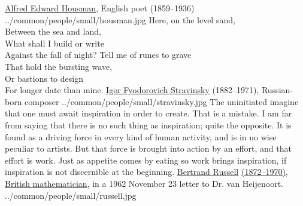 ﻿%
\cleartooddpage%
\thispagestyle{empty}%
\mbox{}\vfill
{}
\qboxnpqt
  {\href{http://en.wikipedia.org/wiki/Housman}{Alfred Edward Housman}, English poet (1859--1936)
    \footnotemark
  }{../common/people/small/housman.jpg}
  {Here, on the level sand, \\
    Between the sea and land, \\
    What shall I build or write \\
    Against the fall of night?
  }{Tell me of runes to grave \\
    That hold the bursting wave, \\
    Or bastions to design \\
    For longer date than mine.
  }
\vfill
\qboxnps
  {
    \href{http://en.wikipedia.org/wiki/Igor_Stravinsky}{Igor Fyodorovich Stravinsky}
    (1882--1971), Russian-born composer
    \footnotemark
  }{../common/people/small/stravinsky.jpg}
  {The uninitiated imagine that one must await inspiration in order to create.
   That is a mistake.
   I am far from saying that there is no such thing as inspiration;
   quite the opposite.
   It is found as a driving force in every kind of human activity, 
   and is in no wise peculiar to artists.
   But that force is brought into action by an effort, 
   and that effort is work.
   Just as appetite comes by eating so work brings inspiration, 
   if inspiration is not discernible at the beginning.
  }
\vfill
\qboxnpq
  { \href{http://en.wikipedia.org/wiki/Bertrand_Russell}{Bertrand Russell}
    \href{http://www-history.mcs.st-andrews.ac.uk/Timelines/TimelineF.html}{(1872--1970)},
    \href{http://www-history.mcs.st-andrews.ac.uk/BirthplaceMaps/Places/UK.html}{British mathematician},
    in a 1962 November 23 letter to Dr. van Heijenoort.
    \footnotemark
  }{../common/people/small/russell.jpg}
